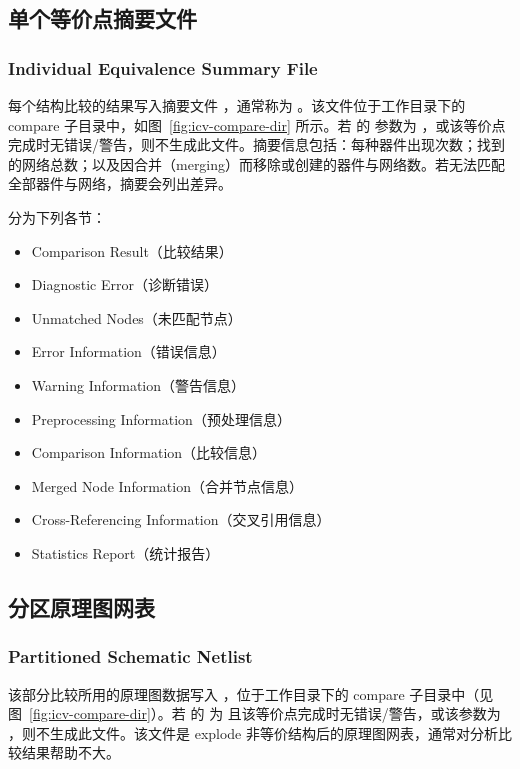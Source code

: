 \subsection{单个等价点摘要文件}
\subsubsection*{Individual Equivalence Summary File}

每个结构比较的结果写入摘要文件 ，通常称为 。该文件位于工作目录下的 compare 子目录中，如图~\ref{fig:icv-compare-dir} 所示。若  的  参数为 ，或该等价点完成时无错误/警告，则不生成此文件。摘要信息包括：每种器件出现次数；找到的网络总数；以及因合并（merging）而移除或创建的器件与网络数。若无法匹配全部器件与网络，摘要会列出差异。

 分为下列各节：
\begin{itemize}
  \item Comparison Result（比较结果）
  \item Diagnostic Error（诊断错误）
  \item Unmatched Nodes（未匹配节点）
  \item Error Information（错误信息）
  \item Warning Information（警告信息）
  \item Preprocessing Information（预处理信息）
  \item Comparison Information（比较信息）
  \item Merged Node Information（合并节点信息）
  \item Cross-Referencing Information（交叉引用信息）
  \item Statistics Report（统计报告）
\end{itemize}

\subsection{分区原理图网表}
\subsubsection*{Partitioned Schematic Netlist}

该部分比较所用的原理图数据写入 ，位于工作目录下的 compare 子目录中（见图~\ref{fig:icv-compare-dir}）。若  的  为  且该等价点完成时无错误/警告，或该参数为 ，则不生成此文件。该文件是 explode 非等价结构后的原理图网表，通常对分析比较结果帮助不大。

